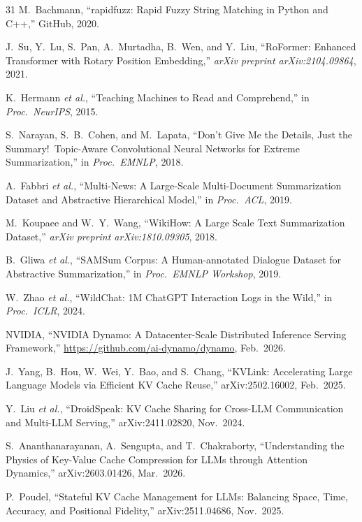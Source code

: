 \documentclass[10pt,twocolumn]{article}
\begin{document}
\begin{thebibliography}{31}
M.~Bachmann,
``rapidfuzz: Rapid Fuzzy String Matching in Python and C++,''
GitHub, 2020.

J.~Su, Y.~Lu, S.~Pan, A.~Murtadha, B.~Wen, and Y.~Liu,
``RoFormer: Enhanced Transformer with Rotary Position Embedding,''
\emph{arXiv preprint arXiv:2104.09864}, 2021.

K.~Hermann \textit{et al.},
``Teaching Machines to Read and Comprehend,''
in \textit{Proc.\ NeurIPS}, 2015.

S.~Narayan, S.~B.~Cohen, and M.~Lapata,
``Don't Give Me the Details, Just the Summary!\ Topic-Aware Convolutional
Neural Networks for Extreme Summarization,''
in \textit{Proc.\ EMNLP}, 2018.

A.~Fabbri \textit{et al.},
``Multi-News: A Large-Scale Multi-Document Summarization Dataset and
Abstractive Hierarchical Model,''
in \textit{Proc.\ ACL}, 2019.

M.~Koupaee and W.~Y.~Wang,
``WikiHow: A Large Scale Text Summarization Dataset,''
\emph{arXiv preprint arXiv:1810.09305}, 2018.

B.~Gliwa \textit{et al.},
``SAMSum Corpus: A Human-annotated Dialogue Dataset for
Abstractive Summarization,''
in \textit{Proc.\ EMNLP Workshop}, 2019.

W.~Zhao \textit{et al.},
``WildChat: 1M ChatGPT Interaction Logs in the Wild,''
in \textit{Proc.\ ICLR}, 2024.

NVIDIA,
``NVIDIA Dynamo: A Datacenter-Scale Distributed Inference Serving
Framework,''
\url{https://github.com/ai-dynamo/dynamo}, Feb.\ 2026.

J.~Yang, B.~Hou, W.~Wei, Y.~Bao, and S.~Chang,
``KVLink: Accelerating Large Language Models via Efficient KV Cache
Reuse,''
arXiv:2502.16002, Feb.\ 2025.

Y.~Liu \textit{et al.},
``DroidSpeak: KV Cache Sharing for Cross-LLM Communication and
Multi-LLM Serving,''
arXiv:2411.02820, Nov.\ 2024.

S.~Ananthanarayanan, A.~Sengupta, and T.~Chakraborty,
``Understanding the Physics of Key-Value Cache Compression for LLMs
through Attention Dynamics,''
arXiv:2603.01426, Mar.\ 2026.

P.~Poudel,
``Stateful KV Cache Management for LLMs: Balancing Space, Time,
Accuracy, and Positional Fidelity,''
arXiv:2511.04686, Nov.\ 2025.


\end{thebibliography}
\end{document}
